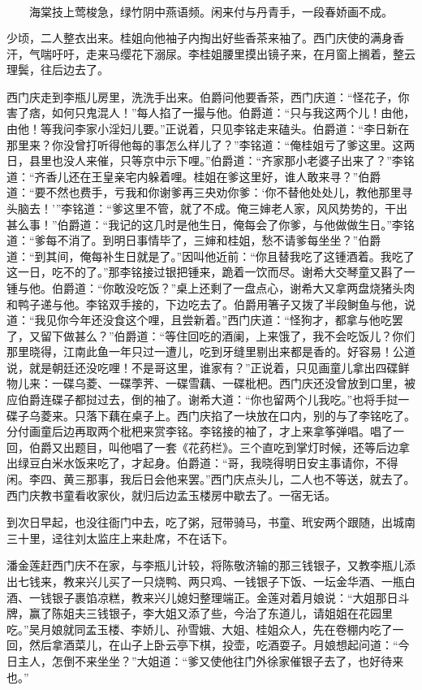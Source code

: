 \[
海棠技上莺梭急，绿竹阴中燕语频。
闲来付与丹青手，一段春娇画不成。
\]

少顷，二人整衣出来。桂姐向他袖子内掏出好些香茶来袖了。西门庆使的满身香汗，气喘吁吁，走来马缨花下溺尿。李桂姐腰里摸出镜子来，在月窗上搁着，整云理鬓，往后边去了。

西门庆走到李瓶儿房里，洗洗手出来。伯爵问他要香茶，西门庆道：“怪花子，你害了痞，如何只鬼混人！”每人掐了一撮与他。伯爵道：“只与我这两个儿！由他，由他！等我问李家小淫妇儿要。”正说着，只见李铭走来磕头。伯爵道：“李日新在那里来？你没曾打听得他每的事怎么样儿了？”李铭道：“俺桂姐亏了爹这里。这两日，县里也没人来催，只等京中示下哩。”伯爵道：“齐家那小老婆子出来了？”李铭道：“齐香儿还在王皇亲宅内躲着哩。桂姐在爹这里好，谁人敢来寻？”伯爵道：“要不然也费手，亏我和你谢爹再三央劝你爹：‘你不替他处处儿，教他那里寻头脑去！’”李铭道：“爹这里不管，就了不成。俺三婶老人家，风风势势的，干出甚么事！”伯爵道：“我记的这几时是他生日，俺每会了你爹，与他做做生日。”李铭道：“爹每不消了。到明日事情毕了，三婶和桂姐，愁不请爹每坐坐？”伯爵道：“到其间，俺每补生日就是了。”因叫他近前：“你且替我吃了这锺酒着。我吃了这一日，吃不的了。”那李铭接过银把锺来，跪着一饮而尽。谢希大交琴童又斟了一锺与他。伯爵道：“你敢没吃饭？”桌上还剩了一盘点心，谢希大又拿两盘烧猪头肉和鸭子递与他。李铭双手接的，下边吃去了。伯爵用箸子又拨了半段鲥鱼与他，说道：“我见你今年还没食这个哩，且尝新着。”西门庆道：“怪狗才，都拿与他吃罢了，又留下做甚么？”伯爵道：“等住回吃的酒阑，上来饿了，我不会吃饭儿？你们那里晓得，江南此鱼一年只过一遭儿，吃到牙缝里剔出来都是香的。好容易！公道说，就是朝廷还没吃哩！不是哥这里，谁家有？”正说着，只见画童儿拿出四碟鲜物儿来：一碟乌菱、一碟荸荠、一碟雪藕、一碟枇杷。西门庆还没曾放到口里，被应伯爵连碟子都挝过去，倒的袖了。谢希大道：“你也留两个儿我吃。”也将手挝一碟子乌菱来。只落下藕在桌子上。西门庆掐了一块放在口内，别的与了李铭吃了。分付画童后边再取两个枇杷来赏李铭。李铭接的袖了，才上来拿筝弹唱。唱了一回，伯爵又出题目，叫他唱了一套《花药栏》。三个直吃到掌灯时候，还等后边拿出绿豆白米水饭来吃了，才起身。伯爵道：“哥，我晓得明日安主事请你，不得闲。李四、黄三那事，我后日会他来罢。”西门庆点头儿，二人也不等送，就去了。西门庆教书童看收家伙，就归后边孟玉楼房中歇去了。一宿无话。

到次日早起，也没往衙门中去，吃了粥，冠带骑马，书童、玳安两个跟随，出城南三十里，迳往刘太监庄上来赴席，不在话下。

潘金莲赶西门庆不在家，与李瓶儿计较，将陈敬济输的那三钱银子，又教李瓶儿添出七钱来，教来兴儿买了一只烧鸭、两只鸡、一钱银子下饭、一坛金华酒、一瓶白酒、一钱银子裹馅凉糕，教来兴儿媳妇整理端正。金莲对着月娘说：“大姐那日斗牌，赢了陈姐夫三钱银子，李大姐又添了些，今治了东道儿，请姐姐在花园里吃。”吴月娘就同孟玉楼、李娇儿、孙雪娥、大姐、桂姐众人，先在卷棚内吃了一回，然后拿酒菜儿，在山子上卧云亭下棋，投壶，吃酒耍子。月娘想起问道：“今日主人，怎倒不来坐坐？”大姐道：“爹又使他往门外徐家催银子去了，也好待来也。”

